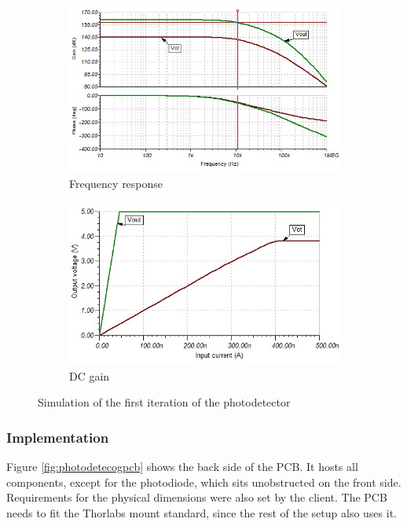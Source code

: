 \begin{figure}[ht]
	\centering
	\begin{subfigure}[1a]{.49\linewidth}
		\includegraphics[width=\linewidth]{img/tina_AC_2probes}
		\caption{Frequency response}
		\label{fig:tinaac2probes}
	\end{subfigure}
	\hfill
	\begin{subfigure}[1b]{.49\linewidth}
		\includegraphics[width=\linewidth]{img/tina_DC_2probes}
		\caption{DC gain}
		\label{fig:tinadc2probes}
	\end{subfigure}
	\caption{Simulation of the first iteration of the photodetector}
	\label{fig:tina2probes}
\end{figure}


\subsubsection{Implementation} 
Figure \ref{fig:photodetecogpcb} shows the back side of the PCB. It hosts all components, except for the photodiode, which sits unobstructed on the front side. Requirements for the physical dimensions were also set by the client. The PCB needs to fit the Thorlabs mount standard, since the rest of the setup also uses it. 

